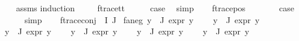 \begin{isabellebody}
%
\isadelimproof
\ \ %
\endisadelimproof
%
\isatagproof
{}\isamarkupfalse%
\ assms\isanewline
{}\isamarkupfalse%
{\isacharparenleft}{\kern0pt}induction\ {\isasymphi}{\isacharparenright}{\kern0pt}\isanewline
\ \ \isamarkupfalse%
\ f{\isacharunderscore}{\kern0pt}trace{\isacharunderscore}{\kern0pt}tt\isanewline
\ \ \isamarkupfalse%
\ \isamarkupfalse%
\ {\isacharquery}{\kern0pt}case\ \isamarkupfalse%
\ simp\isanewline
{}\isamarkupfalse%
\isanewline
\ \ \isamarkupfalse%
\ {\isacharparenleft}{\kern0pt}f{\isacharunderscore}{\kern0pt}trace{\isacharunderscore}{\kern0pt}pos\ {\isasymphi}\ {\isasymalpha}{\isacharparenright}{\kern0pt}\isanewline
\ \ \isamarkupfalse%
\ \isamarkupfalse%
\ {\isacharquery}{\kern0pt}case\ \isanewline
\ \ \ \ \isamarkupfalse%
\ simp\isanewline
{}\isamarkupfalse%
\isanewline
\ \ \isamarkupfalse%
\ {\isacharparenleft}{\kern0pt}f{\isacharunderscore}{\kern0pt}trace{\isacharunderscore}{\kern0pt}conj\ {\isasymPhi}\ I\ J{\isacharparenright}{\kern0pt}\isanewline
\isanewline
{}\isamarkupfalse%
\ fa{\isacharunderscore}{\kern0pt}neg{\isacharcolon}{\kern0pt}\ {\isachardoublequoteopen}{\isasymforall}y{\isasymin}{\isasymPhi}\ {\isacharbackquote}{\kern0pt}\ J{\isachardot}{\kern0pt}\ expr{\isacharunderscore}{\kern0pt}{}\ y\ {\isasymle}\ {}{\isachardoublequoteclose}\ \isanewline
\ {\isachardoublequoteopen}{\isasymforall}y{\isasymin}{\isasymPhi}\ {\isacharbackquote}{\kern0pt}\ J{\isachardot}{\kern0pt}\ expr{\isacharunderscore}{\kern0pt}{}\ y\ {\isasymle}\ {\isasyminfinity}{\isachardoublequoteclose}\ \isanewline
\ {\isachardoublequoteopen}{\isasymforall}y{\isasymin}{\isasymPhi}\ {\isacharbackquote}{\kern0pt}\ J{\isachardot}{\kern0pt}\ expr{\isacharunderscore}{\kern0pt}{}\ y\ {\isasymle}\ {}{\isachardoublequoteclose}\ \isanewline
\ {\isachardoublequoteopen}{\isasymforall}y{\isasymin}{\isasymPhi}\ {\isacharbackquote}{\kern0pt}\ J{\isachardot}{\kern0pt}\ expr{\isacharunderscore}{\kern0pt}{}\ y\ {\isasymle}\ {}{\isachardoublequoteclose}\ \isanewline
\ {\isachardoublequoteopen}{\isasymforall}y{\isasymin}{\isasymPhi}\ {\isacharbackquote}{\kern0pt}\ J{\isachardot}{\kern0pt}\ expr{\isacharunderscore}{\kern0pt}{}\ y\ {\isasymle}\ {}{\isachardoublequoteclose}\ \isanewline
\ {\isachardoublequoteopen}{\isasymforall}y{\isasymin}{\isasymPhi}\ {\isacharbackquote}{\kern0pt}\ J{\isachardot}{\kern0pt}\ expr{\isacharunderscore}{\kern0pt}{}\ y\ {\isasymle}\ {}{\isachardoublequoteclose}\ \isanewline

\end{isabellebody}
